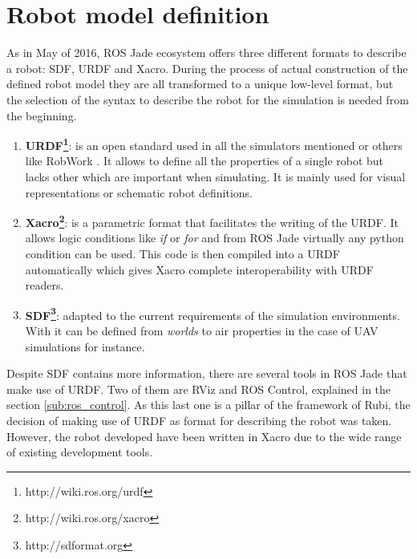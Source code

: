 \section{Robot model definition} %
\label{sec:robot_definition}
As in May of 2016, ROS Jade ecosystem offers three different formats to describe a robot: SDF, URDF and Xacro.
During the process of actual construction of the defined robot model they are all transformed to a unique low-level format, but the selection of the syntax to describe the robot for the simulation is needed from the beginning.

\begin{enumerate}
  \item \textbf{URDF\footnote{http://wiki.ros.org/urdf}}: is an open standard used in all the simulators mentioned or others like RobWork \cite{robwork}. 
  It allows to define all the properties of a single robot but lacks other which are important when simulating. 
  It is mainly used for visual representations or schematic robot definitions.
  \item \textbf{Xacro\footnote{http://wiki.ros.org/xacro}}: is a parametric format that facilitates the writing of the URDF.
  It allows logic conditions like \textit{if} or \textit{for} and from ROS Jade  virtually any python condition can be used.
  This code is then compiled into a URDF automatically which gives Xacro complete interoperability with URDF readers.
  \item \textbf{SDF\footnote{http://sdformat.org}}: adapted to the current requirements of the simulation environments.
  With it can be defined from \textit{worlds} to air properties in the case of UAV simulations for instance.
\end{enumerate}

Despite SDF contains more information, there are several tools in ROS Jade that make use of URDF.
Two of them are RViz and ROS Control, explained in the section \ref{sub:ros_control}.
As this last one is a pillar of the framework of Rubi, the decision of making use of URDF as format for describing the robot was taken.
However, the robot developed have been written in Xacro due to the wide range of existing development tools.
